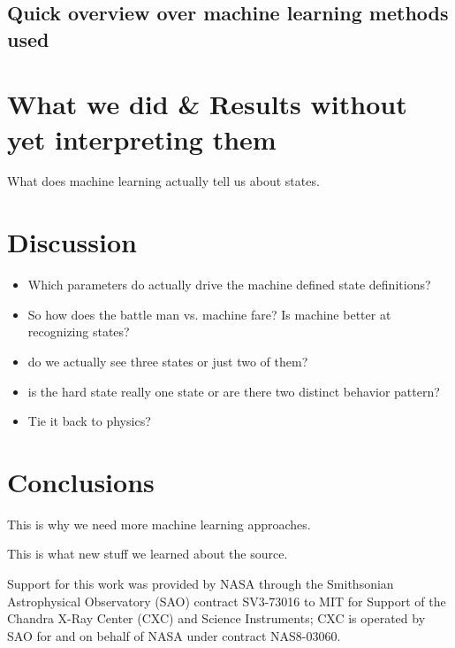 \documentclass{aa}
\begin{document}
\subsection{Quick overview over machine learning methods used}

\section{What we did \& Results without yet interpreting them}

What does machine learning actually tell us about states.

\section{Discussion}

\begin{itemize}

\item Which parameters do actually drive the machine defined state
  definitions?

\item So how does the battle man vs. machine fare? Is machine better
  at recognizing states?

\item do we actually see three states or just two of them?

\item is the hard state really one state or are there two distinct
  behavior pattern?

\item Tie it back to physics?

\end{itemize}

\section{Conclusions}

This is why we need more machine learning approaches.

This is what new stuff we learned about the source.

\begin{acknowledgements}
  Support for this work was provided by NASA through the Smithsonian
  Astrophysical Observatory (SAO) contract SV3-73016 to MIT for
  Support of the Chandra X-Ray Center (CXC) and Science Instruments;
  CXC is operated by SAO for and on behalf of NASA under contract
  NAS8-03060.
\end{acknowledgements}

 

\end{document}
